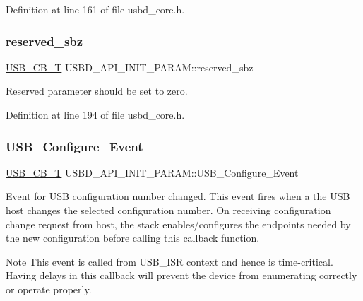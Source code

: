 Definition at line 161 of file usbd\+\_\+core.\+h.

\mbox{\label{struct_u_s_b_d___a_p_i___i_n_i_t___p_a_r_a_m_a8470d3c0f29b31408ffa46dd4a4bd74a}} 
\subsubsection{\texorpdfstring{reserved\+\_\+sbz}{reserved\_sbz}}
{\footnotesize\ttfamily \hyperlink{group___u_s_b_d___core_ga0404ce046312aa5c798cc4a05c417e46}{U\+S\+B\+\_\+\+C\+B\+\_\+T} U\+S\+B\+D\+\_\+\+A\+P\+I\+\_\+\+I\+N\+I\+T\+\_\+\+P\+A\+R\+A\+M\+::reserved\+\_\+sbz}

Reserved parameter should be set to zero. 

Definition at line 194 of file usbd\+\_\+core.\+h.

\mbox{\label{struct_u_s_b_d___a_p_i___i_n_i_t___p_a_r_a_m_ac78477c763bc96613ad5069c84ae3563}} 
\subsubsection{\texorpdfstring{U\+S\+B\+\_\+\+Configure\+\_\+\+Event}{USB\_Configure\_Event}}
{\footnotesize\ttfamily \hyperlink{group___u_s_b_d___core_ga0404ce046312aa5c798cc4a05c417e46}{U\+S\+B\+\_\+\+C\+B\+\_\+T} U\+S\+B\+D\+\_\+\+A\+P\+I\+\_\+\+I\+N\+I\+T\+\_\+\+P\+A\+R\+A\+M\+::\+U\+S\+B\+\_\+\+Configure\+\_\+\+Event}

Event for U\+SB configuration number changed. This event fires when a the U\+SB host changes the selected configuration number. On receiving configuration change request from host, the stack enables/configures the endpoints needed by the new configuration before calling this callback function. ~\newline
 \begin{DoxyNote}{Note}
This event is called from U\+S\+B\+\_\+\+I\+SR context and hence is time-\/critical. Having delays in this callback will prevent the device from enumerating correctly or operate properly. 
\end{DoxyNote}


